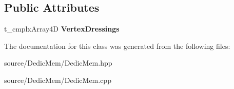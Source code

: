 \subsection*{Public Attributes}
\begin{DoxyCompactItemize}
\item 
\hypertarget{class_c___dedic_mem___kernel_a1b2fcfb12ebf53baed1105d05c61f5fb}{t\-\_\-cmplx\-Array4\-D {\bfseries Vertex\-Dressings}}\label{class_c___dedic_mem___kernel_a1b2fcfb12ebf53baed1105d05c61f5fb}

\end{DoxyCompactItemize}


The documentation for this class was generated from the following files\-:\begin{DoxyCompactItemize}
\item 
source/\-Dedic\-Mem/Dedic\-Mem.\-hpp\item 
source/\-Dedic\-Mem/Dedic\-Mem.\-cpp\end{DoxyCompactItemize}
